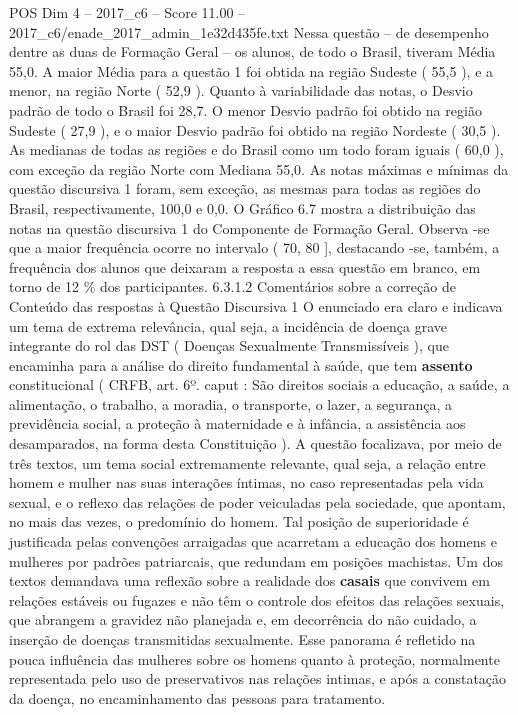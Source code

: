 \begin{textsample}{POS Dim 4 – 2017\_c6 – Score 11.00 – 2017\_c6/enade\_2017\_admin\_1e32d435fe.txt}
Nessa questão – de desempenho dentre as duas de Formação Geral – os alunos, de todo o Brasil, tiveram Média 55,0.
A maior Média para a questão 1 foi obtida na região Sudeste ( 55,5 ), e a menor, na região Norte ( 52,9 ).
Quanto à variabilidade das notas, o Desvio padrão de todo o Brasil foi 28,7.
O menor Desvio padrão foi obtido na região Sudeste ( 27,9 ), e o maior Desvio padrão foi obtido na região Nordeste ( 30,5 ).
As medianas de todas as regiões e do Brasil como um todo foram iguais ( 60,0 ), com exceção da região Norte com Mediana 55,0.
As notas máximas e mínimas da questão discursiva 1 foram, sem exceção, as mesmas para todas as regiões do Brasil, respectivamente, 100,0 e 0,0.
O Gráfico 6.7 mostra a distribuição das notas na questão discursiva 1 do Componente de Formação Geral.
Observa -se que a maior frequência ocorre no intervalo ( 70, 80 ], destacando -se, também, a frequência dos alunos que deixaram a resposta a essa questão em branco, em torno de 12 \% dos participantes. 6.3.1.2 Comentários sobre a correção de Conteúdo das respostas à Questão Discursiva 1 O enunciado era claro e indicava um tema de extrema relevância, qual seja, a incidência de doença grave integrante do rol das DST ( Doenças Sexualmente Transmissíveis ), que encaminha para a análise do direito fundamental à saúde, que tem \textbf{assento} constitucional ( CRFB, art. 6º. caput : São direitos sociais a educação, a saúde, a alimentação, o trabalho, a moradia, o transporte, o lazer, a segurança, a previdência social, a proteção à maternidade e à infância, a assistência aos desamparados, na forma desta Constituição ).
A questão focalizava, por meio de três textos, um tema social extremamente relevante, qual seja, a relação entre homem e mulher nas suas interações íntimas, no caso representadas pela vida sexual, e o reflexo das relações de poder veiculadas pela sociedade, que apontam, no mais das vezes, o predomínio do homem.
Tal posição de superioridade é justificada pelas convenções arraigadas que acarretam a educação dos homens e mulheres por padrões patriarcais, que redundam em posições machistas.
Um dos textos demandava uma reflexão sobre a realidade dos \textbf{casais} que convivem em relações estáveis ou fugazes e não têm o controle dos efeitos das relações sexuais, que abrangem a gravidez não planejada e, em decorrência do não cuidado, a inserção de doenças transmitidas sexualmente.
Esse panorama é refletido na pouca influência das mulheres sobre os homens quanto à proteção, normalmente representada pelo uso de preservativos nas relações intimas, e após a constatação da doença, no encaminhamento das pessoas para tratamento.

\end{textsample}
